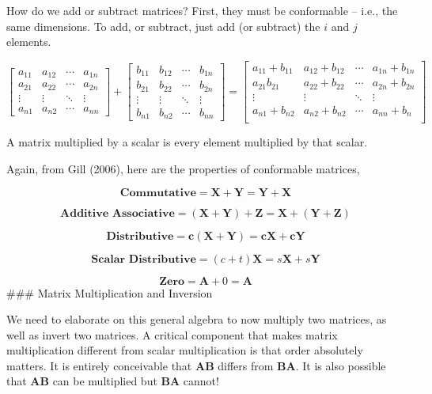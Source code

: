 \documentclass[
]{book}
\begin{document}
How do we add or subtract matrices? First, they must be conformable --
i.e., the same dimensions. To add, or subtract, just add (or subtract)
the \(i\) and \(j\) elements.

\[
\begin{bmatrix}
a_{11}&a_{12}&\cdots &a_{1n} \\
a_{21}&a_{22}&\cdots &a_{2n} \\
\vdots & \vdots & \ddots & \vdots\\
a_{n1}&a_{n2}&\cdots &a_{nn}
\end{bmatrix}+
\begin{bmatrix}
b_{11}&b_{12}&\cdots &b_{1n} \\
b_{21}&b_{22}&\cdots &b_{2n} \\
\vdots & \vdots & \ddots & \vdots\\
b_{n1}&b_{n2}&\cdots &b_{nn}
\end{bmatrix}=
\begin{bmatrix}
a_{11}+b_{11}&a_{12}+b_{12}&\cdots &a_{1n}+b_{1n} \\
a_{21}b_{21}&a_{22}+b_{22}&\cdots &a_{2n}+b_{2n} \\
\vdots & \vdots & \ddots & \vdots\\
a_{n1}+b_{n2}&a_{n2}+b_{n2}&\cdots &a_{nn}+b_{n}\\
\end{bmatrix}
\]

A matrix multiplied by a scalar is every element multiplied by that
scalar.

Again, from Gill (2006), here are the properties of conformable
matrices,

\[\textbf{Commutative}=\textbf{X} + \textbf{Y}=\textbf{Y} + \textbf{X}\]

\[\textbf{Additive Associative}=(\textbf{X}+\textbf{Y})+\textbf{Z}=\textbf{X} + (\textbf{Y}+\textbf{Z}) \]

\[\textbf{Distributive}=\textbf{c}(\textbf{X}+\textbf{Y})=\textbf{c}\textbf{X}+\textbf{c}\textbf{Y}\]

\[\textbf{Scalar Distributive}=(c+t)\textbf{X}=s\textbf{X}+s\textbf{Y}\]

\[\textbf{Zero}=\textbf{A}+0=\textbf{A}\]\#\#\# Matrix Multiplication and
Inversion

We need to elaborate on this general algebra to now multiply two
matrices, as well as invert two matrices. A critical component that
makes matrix multiplication different from scalar multiplication is that
order absolutely matters. It is entirely conceivable that
\(\textbf{A}\textbf{B}\) differs from \(\textbf{B}\textbf{A}\). It is also
possible that \(\textbf{A}\textbf{B}\) can be multiplied but
\(\textbf{B}\textbf{A}\) cannot!
\end{document}
